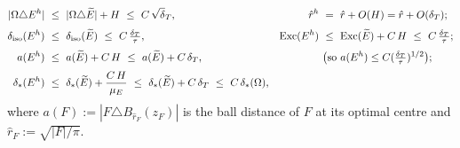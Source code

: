 \begin{lemma}
\begin{enumerate}[label=\textup{(\alph*)},leftmargin=2.4em]
\begin{align}
   |\Om\triangle E^h|\ &\le\ |\Om\triangle\Etil|+H\ \le\ C\,\sqrt\dT,
   &\hat r^h\ &=\ \hat r+O(H)=\hat r+O(\dT);\label{eq:fill-close}\\[1mm]
   \diso(E^h)\ &\le\ \diso(\Etil)\ \le\ C\,\tfrac\dT\tau,
   &\Exc(E^h)\ &\le\ \Exc(\Etil)+C\,H\ \le\ C\,\tfrac\dT\tau;\label{eq:fill-diso}\\[1mm]
   a(E^h)\ &\le\ a(\Etil)+C\,H\ \le\ a(\Etil)+C\,\dT,
   &&\bigl(\text{so }a(E^h)\le C(\tfrac\dT\tau)^{1/2}\bigr);\label{eq:fill-a}\\[1mm]
   \dstar(E^h)\ &\le\ \dstar(\Etil)+\frac{C\,H}{\mu_E}\ \le\ \dstar(\Etil)+C\,\dT
   \ \le\ C\,\dstar(\Om), &&\label{eq:fill-dstar}
\end{align}
where $a(F):=|F\triangle B_{\hat r_F}(z_F)|$ is the ball distance of $F$ at
its optimal centre and $\hat r_F:=\sqrt{|F|/\pi}$.
\end{enumerate}
\end{lemma}

